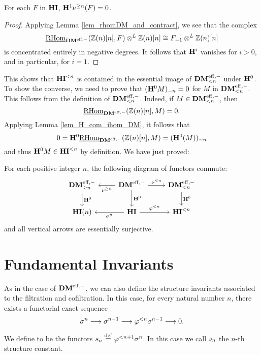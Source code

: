\begin{lem}\label{lem_H1_sgDM_vanishes}
For each $F$ in $\HI$, $\HH^1 \sgDM{n}(F) = 0$.
\end{lem}
\begin{proof}
Applying Lemma \ref{lem_rhomDM_and_contract}, we see that the
complex
\[
\ihomDMf(\Z(n)[n], F) \tDM \Z(n)[n] \cong \RHI{F} \tDM \Z(n)[n]
\] 
is concentrated entirely in negative degrees. It follows that 
$\HH^i$ vanishes for $i > 0$, and in particular, for $i = 
1$.
\end{proof}

This shows that $\TFHI{n}$ is contained in the essential image 
of $\LFiltDM[n]{\DMeff}$ under $\HH^0$. To show the converse, we 
need to prove that $\RHI[n]{(\HH^0 M)} = 0$ for $M$ in 
$\LFiltDM[n]{\DMeff}$. This follows from the definition of 
$\LFiltDM[n]{\DMeff}$. Indeed, if $M \in \LFiltDM[n]{\DMeff}$, 
then 
\[
\ihomDMf(\Z(n)[n], M) = 0.
\] 
Applying Lemma \ref{lem_H_com_ihom_DM}, it follows that
\[
0 = \HH^0\ihomDMf(\Z(n)[n], M) = \RHI[n]{(\HH^0(M))}
\]
and thus $\HH^0 M \in \TFHI{n}$ by definition. We
have just proved:

\begin{prop}\label{prop_H_commute_with_filt}
For each positive integer $n$, the following diagram of functors 
commute:
\[
\begin{tikzcd}
\GFiltDM[n]{\DMeff} \arrow{d}{\HH^0} &
\DMeff \arrow{l}{\sgDM{n}} \arrow{r}{\slDM{n}} \arrow{d}{\HH^0} &
\LFiltDM[n]{\DMeff} \arrow{d}{\HH^0} \\
\HI(n) &
\HI \arrow{l}{\sgHI{n}} \arrow{r}{\tlHI{n}} &
\TFHI{n}
\end{tikzcd}
\]
and all vertical arrows are essentially surjective.
\end{prop}

\section{Fundamental Invariants}

As in the case of $\DMeff$, we can also define the structure 
invariants associated to the filtration and cofiltration. In this
case, for every natural number $n$, there exists a functorial 
exact sequence
\[
\sgHI{n} \to \sgHI{n - 1} \to \tlHI{n}\sgHI{n - 1} \to 0.
\]
\begin{defn}
We define  to be the 
functors $\slice{n} \defeq \tlHI{n + 1}\sgHI{n}$. In this case we 
call $\slice{n}$ the $n$-th structure constant.
\end{defn}

